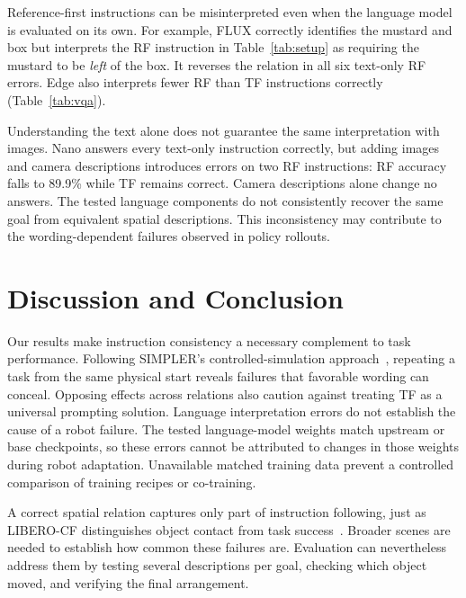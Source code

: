 \documentclass{article}
\begin{document}
Reference-first instructions can be misinterpreted even when the language model is evaluated on its own. For example, FLUX correctly identifies the mustard and box but interprets the RF instruction in Table~\ref{tab:setup} as requiring the mustard to be \emph{left} of the box. It reverses the relation in all six text-only RF errors. Edge also interprets fewer RF than TF instructions correctly (Table~\ref{tab:vqa}).

Understanding the text alone does not guarantee the same interpretation with images. Nano answers every text-only instruction correctly, but adding images and camera descriptions introduces errors on two RF instructions: RF accuracy falls to 89.9\% while TF remains correct. Camera descriptions alone change no answers. The tested language components do not consistently recover the same goal from equivalent spatial descriptions. This inconsistency may contribute to the wording-dependent failures observed in policy rollouts.

\section{Discussion and Conclusion}
Our results make instruction consistency a necessary complement to task performance. Following SIMPLER's controlled-simulation approach~\citep{li2025simpler}, repeating a task from the same physical start reveals failures that favorable wording can conceal. Opposing effects across relations also caution against treating TF as a universal prompting solution. Language interpretation errors do not establish the cause of a robot failure. The tested language-model weights match upstream or base checkpoints, so these errors cannot be attributed to changes in those weights during robot adaptation. Unavailable matched training data prevent a controlled comparison of training recipes or co-training.


A correct spatial relation captures only part of instruction following, just as LIBERO-CF distinguishes object contact from task success~\citep{fang2026counterfactual}. Broader scenes are needed to establish how common these failures are. Evaluation can nevertheless address them by testing several descriptions per goal, checking which object moved, and verifying the final arrangement.

\clearpage

\clearpage
\appendix
\end{document}
